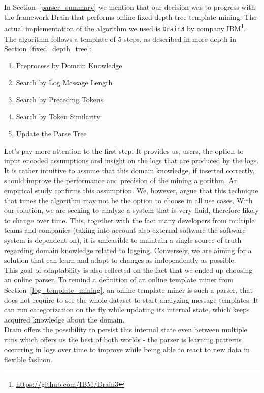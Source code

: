 In Section~\ref{parser_summary} we mention that our decision was to progress with the framework Drain \cite{drain2017} that performs online fixed-depth tree template mining. The actual implementation of the algorithm we used is \texttt{Drain3} by company IBM\footnote{\url{https://github.com/IBM/Drain3}}. The algorithm follows a template of 5 steps, as described in more depth in Section~\ref{fixed_depth_tree}:
\begin{enumerate}
    \item Preprocess by Domain Knowledge
    \item Search by Log Message Length
    \item Search by Preceding Tokens
    \item Search by Token Similarity
    \item Update the Parse Tree
\end{enumerate}

Let's pay more attention to the first step. It provides us, users, the option to input encoded assumptions and insight on the logs that are produced by the logs.
It is rather intuitive to assume that this domain knowledge, if inserted correctly, should improve the performance and precision of the mining algorithm. An empirical study \cite{he2016} confirms this assumption.
We, however, argue that this technique that tunes the algorithm may not be the option to choose in all use cases. With our solution, we are seeking to analyze a system that is very fluid, therefore likely to change over time. This, together with the fact many developers from multiple teams and companies (taking into account also external software the software system is dependent on), it is unfeasible to maintain a single source of truth regarding domain knowledge related to logging. Conversely, we are aiming for a solution that can learn and adapt to changes as independently as possible.\\

This goal of adaptability is also reflected on the fact that we ended up choosing an online parser.
To remind a definition of an online template miner from Section~\ref{log_template_mining}, an online template miner is such a parser, that does not require to see the whole dataset to start analyzing message templates. It can run categorization on the fly while updating its internal state, which keeps acquired knowledge about the domain.\\
Drain offers the possibility to persist this internal state even between multiple runs which offers us the best of both worlds - the parser is learning patterns occurring in logs over time to improve while being able to react to new data in flexible fashion.


